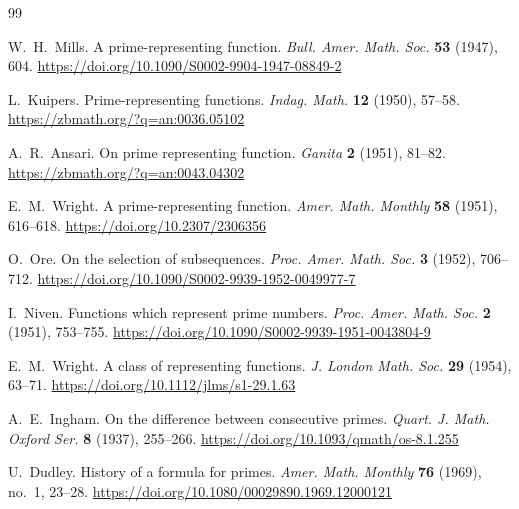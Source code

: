 \documentclass[11pt,reqno]{amsart}
\theoremstyle{blueplain}
\numberwithin{equation}{section}
\def\hyperlink#1#2{#2}}
\begin{document}
\newpage
\begin{thebibliography}{99}
	
	\hypertarget{abbr-source:Mills1947}{}
	W.~H.~Mills.
	A prime-representing function.
	\hyperlink{abbr:journal-Bull-Amer-Math-Soc}{\emph{Bull. Amer. Math. Soc.}} \textbf{53} (1947), 604.
	\url{https://doi.org/10.1090/S0002-9904-1947-08849-2}
	
	\hypertarget{abbr-source:Kuipers1950}{}
	L.~Kuipers.
	Prime-representing functions.
	\hyperlink{abbr:journal-Indag-Math}{\emph{Indag. Math.}} \textbf{12} (1950), 57--58.
	\url{https://zbmath.org/?q=an:0036.05102}
	
	A.~R.~Ansari.
	On prime representing function.
	\emph{Ganita} \textbf{2} (1951), 81--82.
	\url{https://zbmath.org/?q=an:0043.04302}
	
	\hypertarget{abbr-source:Wright1951}{}
	E.~M.~Wright.
	A prime-representing function.
	\hyperlink{abbr:journal-Amer-Math-Monthly}{\emph{Amer. Math. Monthly}} \textbf{58} (1951), 616--618.
	\url{https://doi.org/10.2307/2306356}
	
	\hypertarget{abbr-source:Ore1952}{}
	O.~Ore.
	On the selection of subsequences.
	\hyperlink{abbr:journal-Proc-Amer-Math-Soc}{\emph{Proc. Amer. Math. Soc.}} \textbf{3} (1952), 706--712.
	\url{https://doi.org/10.1090/S0002-9939-1952-0049977-7}
	
	I.~Niven.
	Functions which represent prime numbers.
	\hyperlink{abbr:journal-Proc-Amer-Math-Soc}{\emph{Proc. Amer. Math. Soc.}} \textbf{2} (1951), 753--755.
	\url{https://doi.org/10.1090/S0002-9939-1951-0043804-9}
	
	\hypertarget{abbr-source:Wright1954}{}
	E.~M.~Wright.
	A class of representing functions.
	\hyperlink{abbr:journal-J-London-Math-Soc}{\emph{J. London Math. Soc.}} \textbf{29} (1954), 63--71.
	\url{https://doi.org/10.1112/jlms/s1-29.1.63}
	
	\hypertarget{abbr-source:Ingham1937}{}
	A.~E.~Ingham.
	On the difference between consecutive primes.
	\hyperlink{abbr:journal-Quart-J-Math-Oxford-Ser}{\emph{Quart. J. Math. Oxford Ser.}} \textbf{8} (1937), 255--266.
	\url{https://doi.org/10.1093/qmath/os-8.1.255}
	
	U.~Dudley.
	History of a formula for primes.
	\hyperlink{abbr:journal-Amer-Math-Monthly}{\emph{Amer. Math. Monthly}} \textbf{76} (1969), no.~1, 23--28.
	\url{https://doi.org/10.1080/00029890.1969.12000121}
	

\end{thebibliography}
\end{document}
